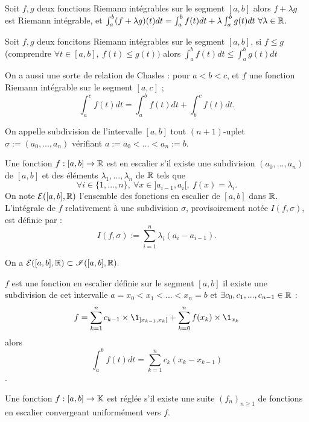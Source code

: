 \bigskip

\bp[Linéarité]
Soit $f,g$ deux fonctions Riemann intégrables sur le segment $[a,b]$ alors $f+\lambda g$ est Riemann intégrable, et $\int_a^b (f+\lambda g)(t)dt = \int_a^b f(t)dt + \lambda \int_a^b g(t) dt ~ \forall \lambda \in \mathbb{R}$.
\ep

\bigskip

\bp[Croissance]
Soit $f,g$ deux foncitons Riemann intégrables sur le segment $[a,b]$, si $f\leq g$ (comprendre $\forall t \in [a,b], ~ f(t) \leq g(t))$ alors $\int_a^b f(t)dt \leq \int_a^b g(t)dt$
\ep

\bigskip

On a aussi une sorte de relation de Chasles : 
pour $a<b<c$, et $f$ une fonction Riemann intégrable sur le segment $[a,c]$ ; $$\int_a^c f(t)dt = \int_a^b f(t)dt + \int_b^c f(t)dt.$$
\ep

\bigskip

\bd[Subdivision]
On appelle subdivision de l'intervalle $[a,b]$ tout $(n+1)$-uplet $\sigma := (a_0,...,a_n)$ vérifiant $a:=a_0 < ... < a_n := b$.
\ed

\bigskip

Une fonction $f : [a,b] \to \mathbb{R}$ est en escalier s'il existe une subdivision $(a_0,...,a_n)$ de $[a,b]$ et des éléments $\lambda_1,...,\lambda_n$ de $\mathbb{R}$ tels que $$\forall i\in \{1,...,n\}, ~ \forall x \in ]a_{i-1},a_i[, ~ f(x) = \lambda_i.$$ 
On note $\mathcal{E}([a,b],\mathbb{R})$ l'ensemble des fonctions en escalier de $[a,b]$ dans $\mathbb{R}$.\\
L'intégrale de $f$ relativement à une subdivision $\sigma$, provisoirement notée $I(f, \sigma)$, est définie par : $$I(f, \sigma) := \sum_{i=1}^n \lambda_i (a_i - a_{i-1}).$$
\ed

\bigskip

\bn
On a $\mathcal{E}([a,b],\mathbb{R}) \subset \mathscr{I}([a,b],\mathbb{R}).$
\en

\bigskip

$f$ est une fonction en escalier définie sur le segment $[a,b]$ \ssi il existe une subdivision de cet intervalle $a=x_0 < x_1 < ... < x_n = b$ et $\exists c_0, c_1,..., c_{n-1} \in \mathbb{R}$ :
$$f = \sum_{k=1}^n c_{k-1} \times \1_{]x_{k-1},x_k[} + \sum_{k=0}^n f(x_k) \times \1_{x_k} $$
alors $$\int_a^b f(t)dt = \sum_{k=1}^n c_k(x_k - x_{k-1})$$.
\ed

\bigskip

Une fonction $f : [a,b] \to \mathbb{K}$ est réglée s'il existe une suite $(f_n)_{n \geq 1}$ de fonctions en escalier convergeant uniformément vers $f$.
\ed

